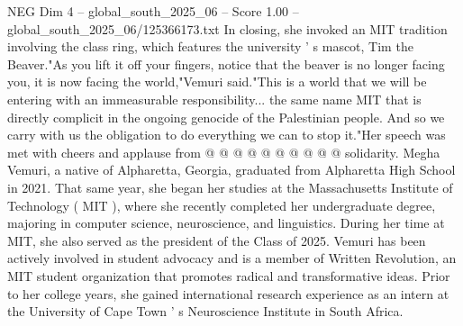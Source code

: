\begin{textsample}{NEG Dim 4 – global\_south\_2025\_06 – Score 1.00 – global\_south\_2025\_06/125366173.txt}
In closing, she invoked an MIT tradition involving the class ring, which features the university ' s mascot, Tim the Beaver."As you lift it off your fingers, notice that the beaver is no longer facing you, it is now facing the world,"Vemuri said."This is a world that we will be entering with an immeasurable responsibility... the same name MIT that is directly complicit in the ongoing genocide of the Palestinian people.
And so we carry with us the obligation to do everything we can to stop it."Her speech was met with cheers and applause from @ @ @ @ @ @ @ @ @ @ solidarity.
Megha Vemuri, a native of Alpharetta, Georgia, graduated from Alpharetta High School in 2021.
That same year, she began her studies at the Massachusetts Institute of Technology ( MIT ), where she recently completed her undergraduate degree, majoring in computer science, neuroscience, and linguistics.
During her time at MIT, she also served as the president of the Class of 2025.
Vemuri has been actively involved in student advocacy and is a member of Written Revolution, an MIT student organization that promotes radical and transformative ideas.
Prior to her college years, she gained international research experience as an intern at the University of Cape Town ' s Neuroscience Institute in South Africa.

\end{textsample}
